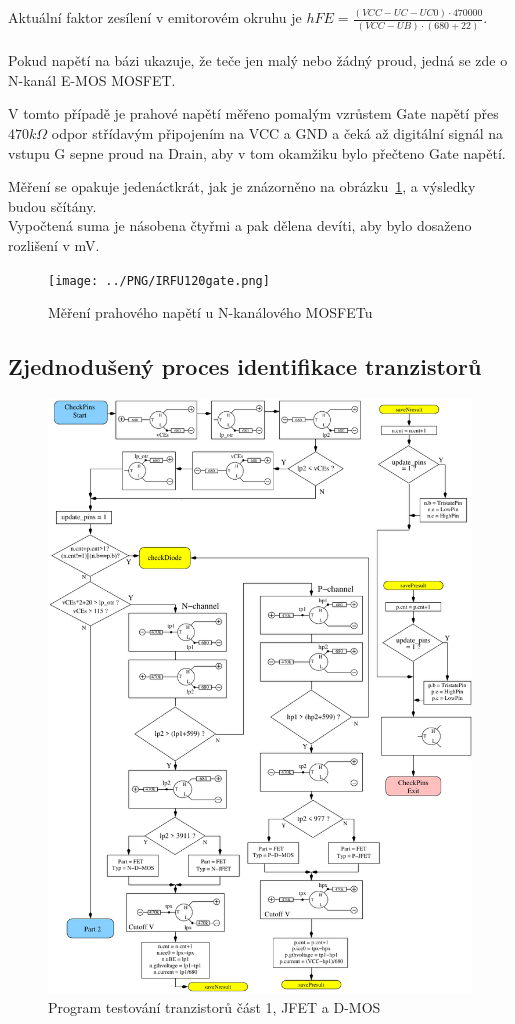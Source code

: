 Aktuální faktor zesílení v emitorovém okruhu je 
\(hFE = \frac{(VCC-UC-UC0)\cdot 470000}{(VCC-UB)\cdot (680+22)}\).\\
\\
Pokud napětí na bázi ukazuje, že teče jen malý nebo žádný proud, jedná se zde o N-kanál E-MOS MOSFET.

V tomto případě je prahové napětí měřeno pomalým vzrůstem Gate napětí přes \(470k\Omega\) odpor střídavým připojením na VCC a GND a čeká až digitální signál na vstupu G sepne proud na Drain, aby v tom okamžiku bylo přečteno Gate napětí.

Měření se opakuje jedenáctkrát, jak je znázorněno na obrázku~\ref{fig:eleven}, a výsledky budou sčítány.
\\
Vypočtená suma je násobena čtyřmi a pak dělena devíti, aby bylo dosaženo rozlišení v mV.

\begin{figure}[H]
\centering
\texttt{[image: ../PNG/IRFU120gate.png]}
\caption{Měření prahového napětí u N-kanálového MOSFETu}
\label{fig:eleven}
\end{figure}

\subsection{Zjednodušený proces identifikace tranzistorů}

\begin{figure}[H]
\centering
\includegraphics[]{../FIG/CheckSemi1.pdf}
\caption{Program testování tranzistorů část 1, JFET a D-MOS}
\label{fig:ChkSemi1}
\end{figure}

